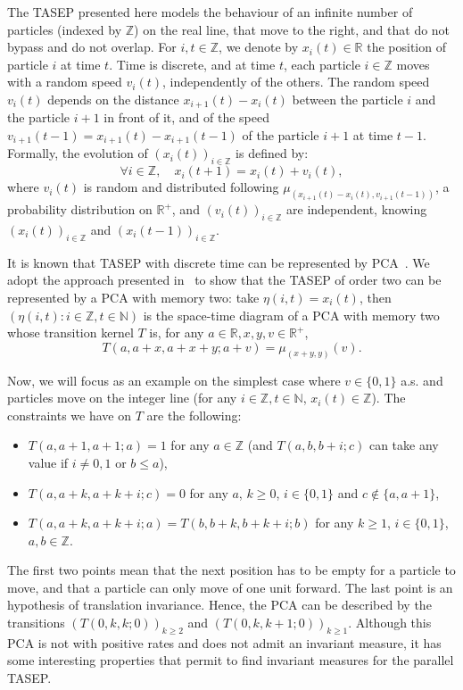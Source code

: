 \documentclass[10pt]{amsart}
\theoremstyle{definition}\newtheorem{defi}[theo]{Definition}\newtheorem{rema}[theo]{Remark}\newtheorem{exam}[theo]{Example}\newtheorem{exem}[theo]{Example}\newtheorem{nota}[theo]{Notation}
\newcounter{a}
\newcommand{\NN}{\mathbb{N}}
\newcommand{\ZZ}{\mathbb{Z}}
\newcommand{\Z}{\mathbb{Z}}
\newcommand{\RR}{\mathbb{R}}
\let\oldforall\forall
\renewcommand*{\forall}{\mathrel{\oldforall}}
\begin{document}
The TASEP presented here models the behaviour of an infinite number of particles (indexed by $\ZZ$) on the real line, that move to the right, and that do not bypass and do not overlap. For $i,t\in\Z$, we denote by $x_i(t)\in \RR$ the position of particle $i$ at time $t$. Time is discrete, and at time $t$, each particle $i\in\ZZ$ moves with a random speed $v_i(t)$, independently of the others. The random speed $v_i(t)$ depends on the distance $x_{i+1}(t)-x_i(t)$ between the particle $i$ and the particle $i+1$ in front of it, and of the speed $v_{i+1}(t-1)=x_{i+1}(t)-x_{i+1}(t-1)$ of the particle $i+1$ at time $t-1$. Formally, the evolution of $(x_i(t))_{i \in \ZZ}$ is defined by:
\begin{equation*}
\forall i\in\ZZ, \quad x_i(t+1) = x_i(t) + v_i(t),
\end{equation*}
where $v_i(t)$ is random and distributed following $\mu_{(x_{i+1}(t)-x_i(t),v_{i+1}(t-1))}$, a probability distribution on $\RR^+$, and $(v_i(t))_{i \in \ZZ}$ are independent, knowing $(x_i(t))_{i\in \ZZ}$ and \linebreak$(x_{i}(t-1))_{i \in \ZZ}$.



It is known that TASEP with discrete time can be represented by PCA~\cite{Casse16,mm_tcs}. We adopt the approach presented in~\cite{Casse16} to show that the TASEP of order two can be represented by a PCA with memory two: take $\eta(i,t) = x_i(t)$, then $(\eta(i,t) : i \in \ZZ, t \in \NN)$ is the space-time diagram of a PCA with memory two whose transition kernel $T$ is, for any $a \in \RR, x,y,v \in \RR^+$,
\begin{equation*}
T(a,a+x,a+x+y;a+v) = \mu_{(x+y,y)}(v).
\end{equation*}


Now, we will focus as an example on the simplest case where $v \in \{0,1\}$ a.s. and particles move on the integer line (for any $i\in\ZZ,t\in\NN$, $x_i(t) \in \ZZ$). The constraints we have on $T$ are the following:
\begin{itemize}
\item $T(a,a+1,a+1;a) =1$ for any $a\in \ZZ$ (and $T(a,b,b+i;c)$ can take any value if $i \neq 0,1$ or $b \leq a$),
\item $T(a,a+k,a+k+i;c) = 0$ for any $a$, $k \geq 0$, $i \in \{0,1\}$ and $c \notin \{a,a+1\}$,
\item $T(a,a+k,a+k+i;a) = T(b,b+k,b+k+i;b)$ for any $k\geq 1$, $i \in \{0,1\}$, $a,b \in \ZZ$.
\end{itemize}
The first two points mean that the next position has to be empty for a particle to move, and that a particle can only move of one unit forward. The last point is an hypothesis of translation invariance. Hence, the PCA can be described by the transitions $(T(0,k,k;0))_{k \geq 2}$ and $(T(0,k,k+1;0))_{k \geq 1}$. Although this PCA is not with positive rates and does not admit an invariant measure, it has some interesting properties that permit to find invariant measures for the parallel TASEP.
\end{document}
